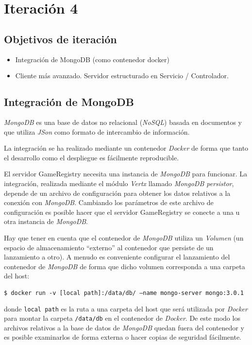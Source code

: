 \chapter{Iteración 4}
\section{Objetivos de iteración}
\begin{itemize}
  \item Integración de MongoDB (como contenedor docker) 
  \item Cliente más avanzado. Servidor estructurado en Servicio / Controlador.
\end{itemize}

\section{Integración de MongoDB}
\emph{MongoDB} es una base de datos no relacional (\emph{NoSQL}) basada en documentos y
que utiliza \emph{JSon} como formato de intercambio de información.

La integración se ha realizado mediante un contenedor \emph{Docker} de forma que tanto el
desarrollo como el despliegue es fácilmente reproducible.

El servidor GameRegistry necesita una instancia de \emph{MongoDB} para funcionar.
La integración, realizada mediante el módulo \emph{Vertx} llamado \emph{MongoDB persistor}, depende
de un archivo de configuración para obtener los datos relativos a la conexión con \emph{MongoDB}.
Cambiando los parámetros de este archivo de configuración es posible hacer que el servidor
GameRegistry se conecte a una u otra instancia de \emph{MongoDB}.

Hay que tener en cuenta que el contenedor de \emph{MongoDB} utiliza un \emph{Volumen} (un espacio
de almacenamiento ``externo'' al contenedor que persiste de un lanzamiento a otro). A menudo es
conveniente configurar el lanzamiento del contenedor de \emph{MongoDB} de forma que dicho volumen
corresponda a una carpeta del host:

\texttt{\$ docker run -v [local path]:/data/db/ --name mongo-server mongo:3.0.1}

donde \texttt{local path} es la ruta a una carpeta del host que será utilizada por \emph{Docker}
para montar la carpeta \texttt{/data/db} en el contenedor de \emph{Docker}. De este modo
los archivos relativos a la base de datos de \emph{MongoDB} quedan fuera del contenedor y es
posible examinarlos de forma externa o hacer copias de seguridad fácilmente.

